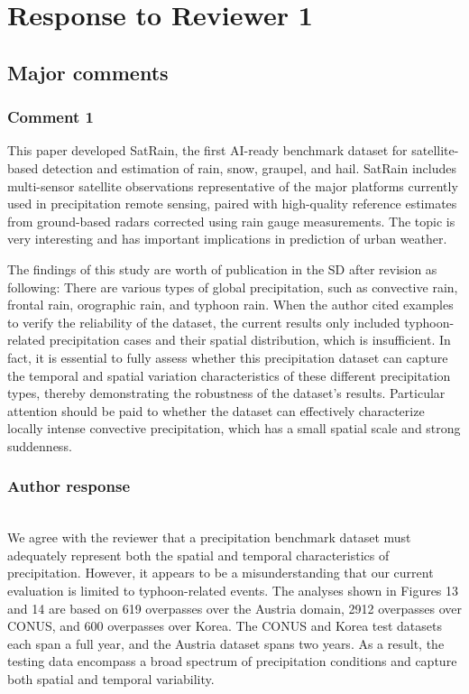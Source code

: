 \section*{Response to Reviewer 1}


\subsection*{Major comments}

\subsubsection*{Comment 1}

\rc
This paper developed SatRain, the first AI-ready benchmark dataset for satellite-based detection and estimation of rain, snow, graupel, and hail. SatRain includes multi-sensor satellite observations representative of the major platforms currently used in precipitation remote sensing, paired with high-quality reference estimates from ground-based radars corrected using rain gauge measurements. The topic is very interesting and has important implications in prediction of urban weather.

The findings of this study are worth of publication in the SD after revision as following: There are various types of global precipitation, such as convective rain, frontal rain, orographic rain, and typhoon rain. When the author cited examples to verify the reliability of the dataset, the current results only included typhoon-related precipitation cases and their spatial distribution, which is insufficient. In fact, it is essential to fully assess whether this precipitation dataset can capture the temporal and spatial variation characteristics of these different precipitation types, thereby demonstrating the robustness of the dataset's results. Particular attention should be paid to whether the dataset can effectively characterize locally intense convective precipitation, which has a small spatial scale and strong suddenness.
\reply

\subsubsection*{Author response} \\

We agree with the reviewer that a precipitation benchmark dataset must
adequately represent both the spatial and temporal characteristics of
precipitation. However, it appears to be a misunderstanding that our current
evaluation is limited to typhoon-related events. The analyses shown in Figures
13 and 14 are based on 619 overpasses over the Austria domain, 2912 overpasses
over CONUS, and 600 overpasses over Korea. The CONUS and Korea test datasets
each span a full year, and the Austria dataset spans two years. As a result, the
testing data encompass a broad spectrum of precipitation conditions and capture
both spatial and temporal variability.

